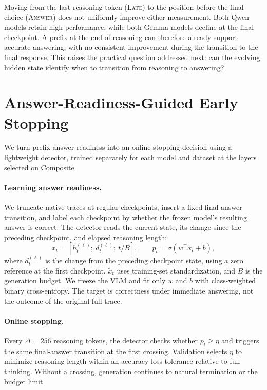 \documentclass{article} %
\begin{document}
Moving from the last reasoning token (\textsc{Late}) to the position before the final choice (\textsc{Answer}) does not uniformly improve either measurement. Both Qwen models retain high performance, while both Gemma models decline at the final checkpoint. A prefix at the end of reasoning can therefore already support accurate answering, with no consistent improvement during the transition to the final response. This raises the practical question addressed next: can the evolving hidden state identify when to transition from reasoning to answering?

\section{Answer-Readiness-Guided Early Stopping}
\label{sec:early_stopping}

We turn prefix answer readiness into an online stopping decision using a lightweight detector, trained separately for each model and dataset at the layers selected on Composite.

\paragraph{Learning answer readiness.}
We truncate native traces at regular checkpoints, insert a fixed final-answer transition, and label each checkpoint by whether the frozen model's resulting answer is correct. The detector reads the current state, its change since the preceding checkpoint, and elapsed reasoning length:
\begin{equation}
    x_t=[h_t^{(\ell)};\ d_t^{(\ell)};\ t/B],
    \qquad p_t=\sigma(w^\top\tilde x_t+b),
\end{equation}
where $d_t^{(\ell)}$ is the change from the preceding checkpoint state, using a zero reference at the first checkpoint. $\tilde x_t$ uses training-set standardization, and $B$ is the generation budget. We freeze the VLM and fit only $w$ and $b$ with class-weighted binary cross-entropy. The target is correctness under immediate answering, not the outcome of the original full trace.

\paragraph{Online stopping.}
Every $\Delta=256$ reasoning tokens, the detector checks whether $p_t\geq\eta$ and triggers the same final-answer transition at the first crossing. Validation selects $\eta$ to minimize reasoning length within an accuracy-loss tolerance relative to full thinking. Without a crossing, generation continues to natural termination or the budget limit.
\end{document}
